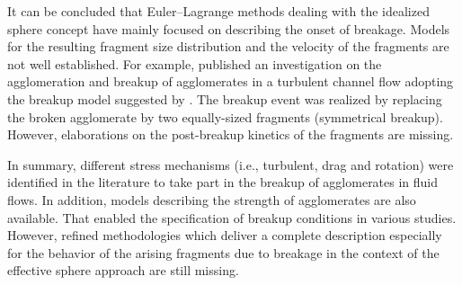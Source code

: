 It can be concluded that Euler--Lagrange methods dealing with the
idealized sphere concept have mainly focused on describing the onset
of breakage. Models for the resulting fragment size distribution and
the velocity of the fragments are not well established.  For example,
\citet{Njobuenwu2018} published an investigation on the agglomeration
and breakup of agglomerates in a turbulent channel flow adopting the
breakup model suggested by \citet{babler2015}. The breakup event was
realized by replacing the broken agglomerate by two equally-sized
fragments (symmetrical breakup). However, elaborations on the
post-breakup kinetics of the fragments are missing. \newline

In summary, different stress mechanisms (i.e., turbulent, drag and
rotation) were identified in the literature to take part in the
breakup of agglomerates in fluid flows. In addition, models describing
the strength of agglomerates are also available. That enabled the
specification of breakup conditions in various studies.  However,
refined methodologies which deliver a complete description especially
for the behavior of the arising fragments due to breakage in the
context of the effective sphere approach are still missing.
%
%

